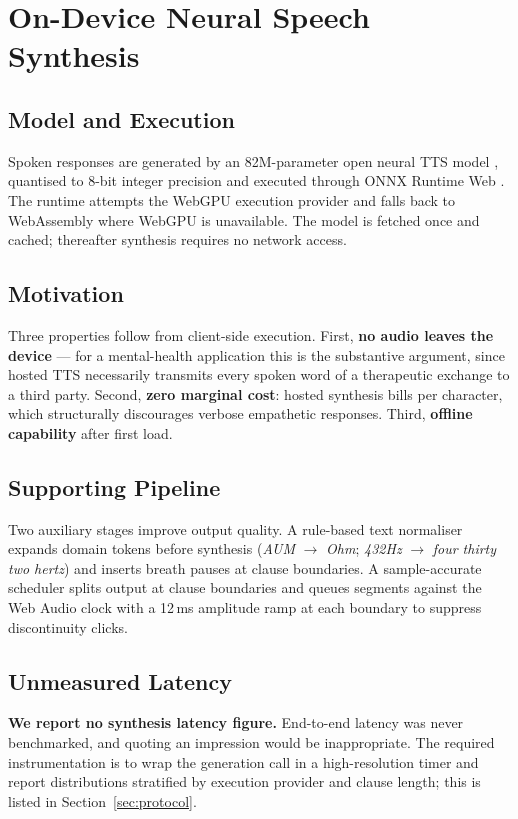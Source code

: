\documentclass[runningheads]{llncs}
\begin{document}
\section{On-Device Neural Speech Synthesis}
\label{sec:tts}

\subsection{Model and Execution}
Spoken responses are generated by an 82M-parameter open neural TTS model
\cite{kokoro}, quantised to 8-bit integer precision and executed through ONNX
Runtime Web \cite{onnxweb}. The runtime attempts the WebGPU execution provider
\cite{webgpu} and falls back to WebAssembly where WebGPU is unavailable. The
model is fetched once and cached; thereafter synthesis requires no network
access.

\subsection{Motivation}
Three properties follow from client-side execution. First, \textbf{no audio
leaves the device} --- for a mental-health application this is the substantive
argument, since hosted TTS necessarily transmits every spoken word of a
therapeutic exchange to a third party. Second, \textbf{zero marginal cost}:
hosted synthesis bills per character, which structurally discourages verbose
empathetic responses. Third, \textbf{offline capability} after first load.

\subsection{Supporting Pipeline}
Two auxiliary stages improve output quality. A rule-based text normaliser
expands domain tokens before synthesis (\textit{AUM} $\rightarrow$
\textit{Ohm}; \textit{432Hz} $\rightarrow$ \textit{four thirty two hertz}) and
inserts breath pauses at clause boundaries. A sample-accurate scheduler splits
output at clause boundaries and queues segments against the Web Audio clock
with a 12\,ms amplitude ramp at each boundary to suppress discontinuity clicks.

\subsection{Unmeasured Latency}
\textbf{We report no synthesis latency figure.} End-to-end latency was never
benchmarked, and quoting an impression would be inappropriate. The required
instrumentation is to wrap the generation call in a high-resolution timer and
report distributions stratified by execution provider and clause length; this
is listed in Section~\ref{sec:protocol}.
\end{document}
